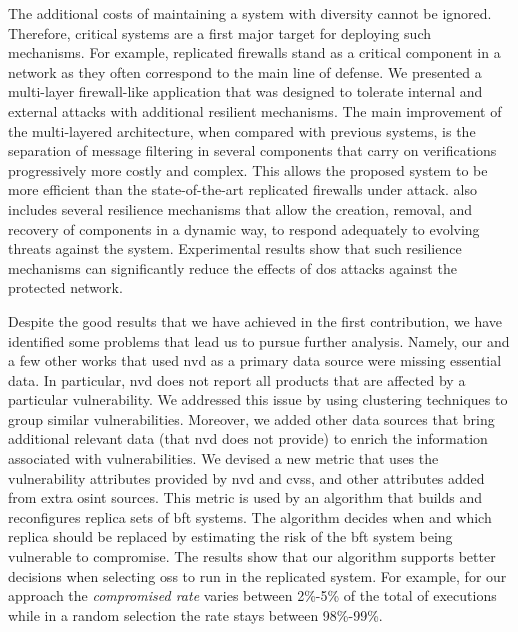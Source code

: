 The additional costs of maintaining a system with diversity cannot be ignored. 
Therefore, critical systems are a first major target for deploying such mechanisms.
For example, replicated firewalls stand as a critical component in a network as they often correspond to the main line of defense.
We presented \sieveq a multi-layer firewall-like application that was designed to tolerate internal and external attacks with additional resilient mechanisms.
The main improvement of the \sieveq multi-layered architecture, when compared with previous systems, is the separation of message filtering in several components that carry on verifications progressively more costly and complex.
This allows the proposed system to be more efficient than the state-of-the-art replicated firewalls under attack.
\sieveq also includes several resilience mechanisms that allow the creation, removal, and recovery of components in a dynamic way, to respond adequately to evolving threats against the system. 
Experimental results show that such resilience mechanisms can significantly reduce the effects of \gls{dos} attacks against the protected network.


Despite the good results that we have achieved in the first contribution, we have identified some problems that lead us to pursue further analysis.
Namely, our and a few other works that used \gls{nvd} as a primary data source were missing essential data. 
In particular, \gls{nvd} does not report all products that are affected by a particular vulnerability.
We addressed this issue by using clustering techniques to group similar vulnerabilities.
Moreover, we added other data sources that bring additional relevant data (that \gls{nvd} does not provide) to enrich the information associated with vulnerabilities.
We devised a new metric that uses the vulnerability attributes provided by \gls{nvd} and \gls{cvss}, and other attributes added from extra \gls{osint} sources. 
This metric is used by an algorithm that builds and reconfigures replica sets of \gls{bft} systems.
The algorithm decides when and which replica should be replaced by estimating the risk of the \gls{bft} system being vulnerable to compromise.
The results show that our algorithm supports better decisions when selecting \glspl{os} to run in the replicated system. 
For example, for our approach the \emph{compromised rate} varies between 2\%-5\% of the total of executions while in a random selection the rate stays between 98\%-99\%.
 

